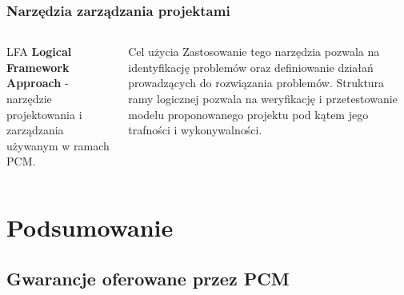 \documentclass{beamer}
\begin{document}
\begin{frame}\frametitle{Narzędzia zarządzania projektami}
    \begin{columns}
    
        	\centering
        	
        	\begin{block}{LFA}
                \textbf{Logical Framework Approach} - narzędzie projektowania i zarządzania używanym w ramach PCM.
            \end{block}
        
    		\centering
    		
    		\begin{exampleblock}{Cel użycia}
    	        Zastosowanie tego narzędzia pozwala na identyfikację problemów oraz definiowanie działań prowadzących do rozwiązania problemów. Struktura ramy logicznej pozwala na weryfikację i przetestowanie modelu proponowanego projektu pod kątem jego trafności i wykonywalności.
            \end{exampleblock}
			
	\end{columns}
	
\end{frame}




\section{Podsumowanie}

\subsection{Gwarancje oferowane przez PCM}
\end{document}
